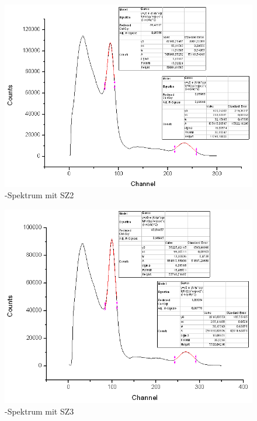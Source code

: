 \begin{figure}[H]
 \centering  \includegraphics[height=0.4\textheight]{Graphen/SZ2.png}
 \caption{\Na-Spektrum mit SZ2}
\end{figure}

\begin{figure}[H]
 \centering  \includegraphics[height=0.4\textheight]{Graphen/SZ3.png}
 \caption{\Na-Spektrum mit SZ3}
\end{figure}  

